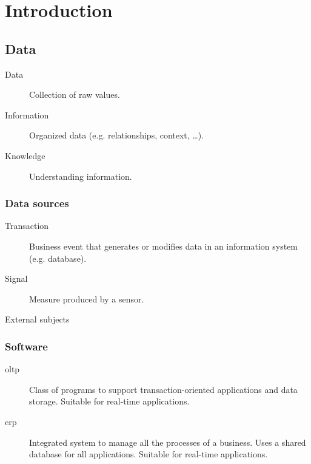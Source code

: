 \chapter{Introduction}


\section{Data}

\begin{description}
    \item[Data] 
        Collection of raw values.

    \item[Information] 
        Organized data (e.g. relationships, context, \dots).

    \item[Knowledge] 
        Understanding information.
\end{description}


\subsection{Data sources}
\begin{description}
    \item[Transaction] 
        Business event that generates or modifies data in an information system (e.g. database).

    \item[Signal] 
        Measure produced by a sensor.

    \item[External subjects]
\end{description}


\subsection{Software}
\begin{description}
    \item[\Ac{oltp}]  
        Class of programs to support transaction-oriented applications and data storage.
        Suitable for real-time applications.

    \item[\Ac{erp}]  
        Integrated system to manage all the processes of a business.
        Uses a shared database for all applications.
        Suitable for real-time applications.
\end{description}


